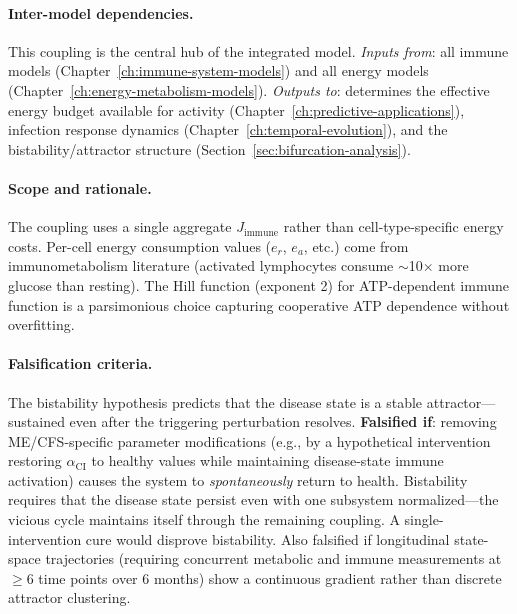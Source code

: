 \paragraph{Inter-model dependencies.}
This coupling is the central hub of the integrated model. \emph{Inputs from}: all immune models (Chapter~\ref{ch:immune-system-models}) and all energy models (Chapter~\ref{ch:energy-metabolism-models}). \emph{Outputs to}: determines the effective energy budget available for activity (Chapter~\ref{ch:predictive-applications}), infection response dynamics (Chapter~\ref{ch:temporal-evolution}), and the bistability/attractor structure (Section~\ref{sec:bifurcation-analysis}).

\paragraph{Scope and rationale.}
The coupling uses a single aggregate $J_{\text{immune}}$ rather than cell-type-specific energy costs. Per-cell energy consumption values ($e_r$, $e_a$, etc.) come from immunometabolism literature (activated lymphocytes consume $\sim$10$\times$ more glucose than resting). The Hill function (exponent 2) for ATP-dependent immune function is a parsimonious choice capturing cooperative ATP dependence without overfitting.

\paragraph{Falsification criteria.}
The bistability hypothesis predicts that the disease state is a stable attractor---sustained even after the triggering perturbation resolves. \textbf{Falsified if}: removing ME/CFS-specific parameter modifications (e.g., by a hypothetical intervention restoring $\alpha_{\text{CI}}$ to healthy values while maintaining disease-state immune activation) causes the system to \emph{spontaneously} return to health. Bistability requires that the disease state persist even with one subsystem normalized---the vicious cycle maintains itself through the remaining coupling. A single-intervention cure would disprove bistability. Also falsified if longitudinal state-space trajectories (requiring concurrent metabolic and immune measurements at $\geq$6 time points over 6 months) show a continuous gradient rather than discrete attractor clustering.

